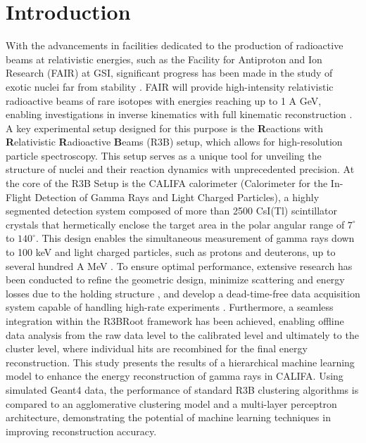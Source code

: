 \documentclass[final,5p,times,twocolumn]{elsarticle}
\begin{document}
\section{Introduction}
\label{sec:intro}
With the advancements in facilities dedicated to the production of radioactive beams at relativistic energies, such as the Facility for Antiproton and Ion Research (FAIR) at GSI, significant progress has been made in the study of exotic nuclei far from stability \cite{kalantar2024experiments}. FAIR will provide high-intensity relativistic radioactive beams of rare isotopes with energies reaching up to 1 A GeV, enabling investigations in inverse kinematics with full kinematic reconstruction \cite{leifels2025status}.
A key experimental setup designed for this purpose is the \textbf{R}eactions with \textbf{R}elativistic \textbf{R}adioactive \textbf{B}eams (R3B) setup, which allows for high-resolution particle spectroscopy. This setup serves as a unique tool for unveiling the structure of nuclei and their reaction dynamics with unprecedented precision.\newline
At the core of the R3B Setup is the CALIFA calorimeter (Calorimeter for the In-Flight Detection of Gamma Rays and Light Charged Particles), a highly segmented detection system composed of more than 2500 CsI(Tl) scintillator crystals that hermetically enclose the target area in the polar angular range of $7^\circ$ to $140^\circ$. This design enables the simultaneous measurement of gamma rays down to 100 keV and light charged particles, such as protons and deuterons, up to several hundred A MeV \cite{cortina2014califa}. To ensure optimal performance, extensive research has been conducted to refine the geometric design, minimize scattering and energy losses due to the holding structure \cite{alvarez2014performance}, and develop a dead-time-free data acquisition system capable of handling high-rate experiments \cite{ledigital}. Furthermore, a seamless integration within the R3BRoot framework \cite{bertini2011r3broot} has been achieved, enabling offline data analysis from the raw data level to the calibrated level and ultimately to the cluster level, where individual hits are recombined for the final energy reconstruction.\newline
This study presents the results of a hierarchical machine learning model to enhance the energy reconstruction of gamma rays in CALIFA. Using simulated Geant4 data, the performance of standard R3B clustering algorithms is compared to an agglomerative clustering model \cite{Nielsen2016} and a multi-layer perceptron architecture, demonstrating the potential of machine learning techniques in improving reconstruction accuracy.\newline
\end{document}

